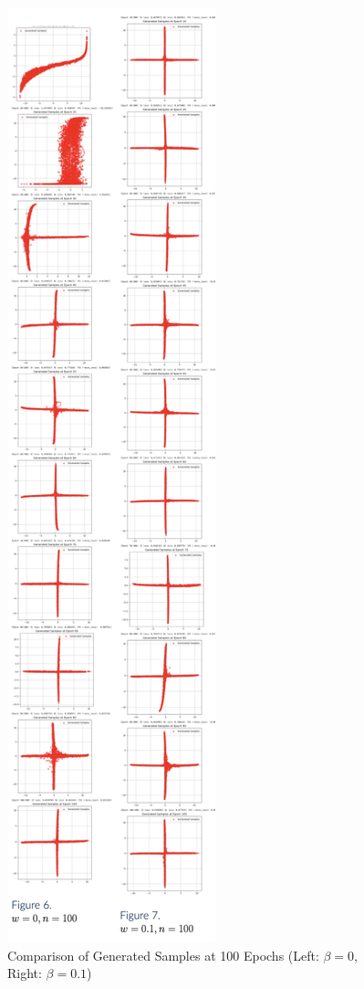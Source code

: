 \documentclass[lettersize,journal]{IEEEtran}
\begin{document}
\begin{figure}[!ht]
    \centering
    \includegraphics[width=0.5\linewidth]{figures/cross_100epochs.png}
    \caption{Comparison of Generated Samples at 100 Epochs (Left: \( \beta = 0 \), Right: \( \beta = 0.1 \))}
    \label{fig:100-epochs}
\end{figure}
\end{document}
